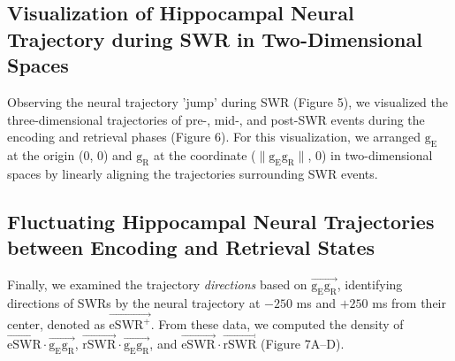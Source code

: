 \subsection{Visualization of Hippocampal Neural Trajectory during SWR in Two-Dimensional Spaces}
Observing the neural trajectory 'jump' during SWR (Figure 5), we visualized the three-dimensional trajectories of pre-, mid-, and post-SWR events during the encoding and retrieval phases (Figure 6). For this visualization, we arranged $\mathrm{g_{E}}$ at the origin (0, 0) and $\mathrm{g_{R}}$ at the coordinate ($\mathrm{\lVert g_{E}g_{R} \rVert}$, 0) in two-dimensional spaces by linearly aligning the trajectories surrounding SWR events. 

\subsection{Fluctuating Hippocampal Neural Trajectories between Encoding and Retrieval States}
Finally, we examined the trajectory \textit{directions} based on $\overrightarrow{\mathrm{g_{E}g_{R}}}$, identifying directions of SWRs by the neural trajectory at $-250$ ms and $+250$ ms from their center, denoted as $\overrightarrow{\mathrm{eSWR^+}}$. From these data, we computed the density of $\overrightarrow{\mathrm{eSWR}} \cdot \overrightarrow{\mathrm{g_{E}g_{R}}}$, $\overrightarrow{\mathrm{rSWR}} \cdot \overrightarrow{\mathrm{g_{E}g_{R}}}$, and $\overrightarrow{\mathrm{eSWR}} \cdot \overrightarrow{\mathrm{rSWR}}$ (Figure 7A--D).